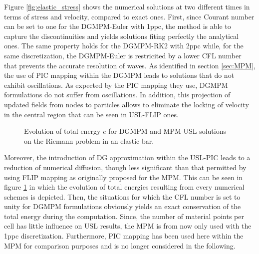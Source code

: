 Figure \ref{fig:elastic_stress} shows the numerical solutions at two different times in terms of stress and velocity, compared to exact ones. 
First, since Courant number can be set to one for the DGMPM-Euler with 1ppc, the method is able to capture the discontinuities and yields solutions fiting perfectly the analytical ones. The same property holds for the DGMPM-RK2 with 2ppc while, for the same discretization, the DGMPM-Euler is restricited by a lower CFL number that prevents the accurate resolution of waves.
As identified in section \ref{sec:MPM}, the use of PIC mapping within the DGMPM leads to solutions that do not exhibit oscillations.
As expected by the PIC mapping they use, DGMPM formulations do not suffer from oscillations. 
In addition, this projection of updated fields from nodes to particles allows to eliminate the locking of velocity in the central region that can be seen in USL-FLIP ones.
\begin{figure}[h!]
  \centering
  
  \caption{Evolution of total energy $e$ for DGMPM and MPM-USL solutions on the Riemann problem in an elastic bar.}
  \label{fig:energy_elastic_RP}
\end{figure}
Moreover, the introduction of DG approximation within the USL-PIC leads to a reduction of numerical diffusion, though less significant than that permitted by using FLIP mapping as originally proposed for the MPM. This can be seen in figure \ref{fig:energy_elastic_RP} in which the evolution of total energies resulting from every numerical schemes is depicted.
Then, the situations for which the CFL number is set to unity for DGMPM formulations obviously yields an exact conservation of the total energy during the computation.
Since, the number of material points per cell has little influence on USL results, the MPM is from now only used with the 1ppc discretization. Furthermore, PIC mapping has been used here within the MPM for comparison purposes and is no longer considered in the following.
